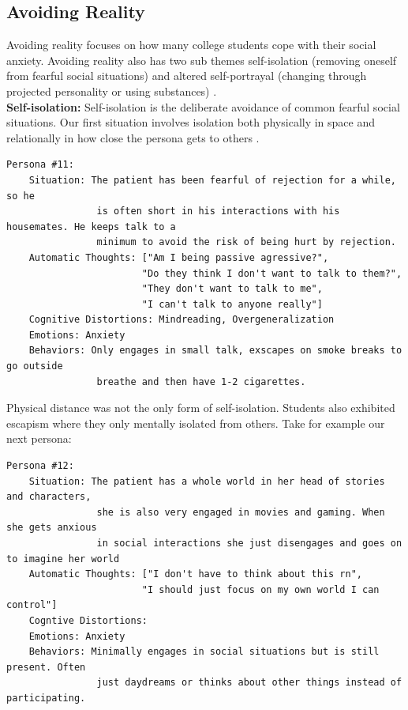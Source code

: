 \documentclass[twoside]{report}
\begin{document}
\subsection{Avoiding Reality}
Avoiding reality focuses on how many college students cope with their social anxiety. Avoiding reality also has two sub themes self-isolation (removing oneself from fearful social situations) and altered self-portrayal (changing through projected personality or using substances) \cite{lee2022socially}. \\

\textbf{Self-isolation:} Self-isolation is the deliberate avoidance of common fearful social situations. Our first situation involves isolation both physically in space and relationally in how close the persona gets to others \cite{lee2022socially}. 

\begin{verbatim}
Persona #11:
    Situation: The patient has been fearful of rejection for a while, so he 
                is often short in his interactions with his housemates. He keeps talk to a 
                minimum to avoid the risk of being hurt by rejection.
    Automatic Thoughts: ["Am I being passive agressive?",
                        "Do they think I don't want to talk to them?",
                        "They don't want to talk to me",
                        "I can't talk to anyone really"]
    Cognitive Distortions: Mindreading, Overgeneralization
    Emotions: Anxiety
    Behaviors: Only engages in small talk, exscapes on smoke breaks to go outside
                breathe and then have 1-2 cigarettes.
\end{verbatim}
Physical distance was not the only form of self-isolation. Students also exhibited escapism where they only mentally isolated from others. Take for example our next persona:
\begin{verbatim}
Persona #12:
    Situation: The patient has a whole world in her head of stories and characters,
                she is also very engaged in movies and gaming. When she gets anxious 
                in social interactions she just disengages and goes on to imagine her world
    Automatic Thoughts: ["I don't have to think about this rn",
                        "I should just focus on my own world I can control"]
    Cogntive Distortions: 
    Emotions: Anxiety
    Behaviors: Minimally engages in social situations but is still present. Often
                just daydreams or thinks about other things instead of participating. 
\end{verbatim}
\end{document}
